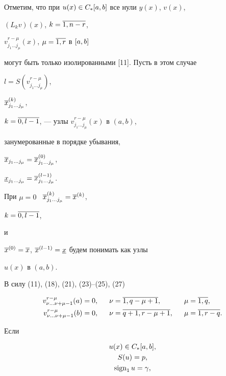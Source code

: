 Отметим, что при $u(x)\in C_{*}[a,b]$ все нули $y(x)$, $v(x)$,


$(L_k v)(x)$, $k=\overline{1,n-r}$,


$v^{r-\mu}_{j_1\dotsc j_\mu}(x)$, $\mu=\overline{1,r}$ в $[a,b]$ 


могут быть только изолированными [11]. Пусть в этом случае


$l=S(v^{r-\mu}_{j_1\dotsc j_\mu})$,


$\overline{x}_{j_1\dotsc j_\mu}^{(k)}$,


$k=\overline{0,l-1}$, --- узлы $v^{r-\mu}_{j_1\dotsc j_\mu}(x)$ в $(a,b)$,


занумерованные в порядке убывания,


$\overline{x}_{j_1\dotsc j_\mu}=\overline{x}_{j_1\dotsc j_\mu}^{(0)}$,


$\underline{x}_{j_1\dotsc j_\mu}=\overline{x}_{j_1\dotsc j_\mu}^{(l-1)}$.


При $\mu=0$ \ $\overline{x}_{j_1\dotsc j_\mu}^{(k)}=\overline{x}^{(k)}$,


$k=\overline{0,l-1}$,


и


$\overline{x}^{(0)}=\overline{x}$, $\overline{x}^{(l-1)}=\underline{x}$ будем понимать как узлы


$u(x)$ в $(a,b)$.





В силу (11), (18), (21), (23)--(25), (27)


\begin{alignat}{3}


v^{r-\mu}_{\nu\dotsc \nu+\mu-1}(a)&=0, &\ \ \nu&=\o{1,q-\mu+1},


& \ \ \mu&=\o{1,q},\\


%


v^{r-\mu}_{\nu\dotsc \nu+\mu-1}(b)&=0, &\ \ \nu&=\o{q+1,r-\mu+1},


&\ \ \mu&=\o{1,r-q}.


\end{alignat}





Если


\begin{gather}


u(x)\in C_{*}\ab,\\


S(u)=p,\\


\sign_1 u=\gamma,


\end{gather}


